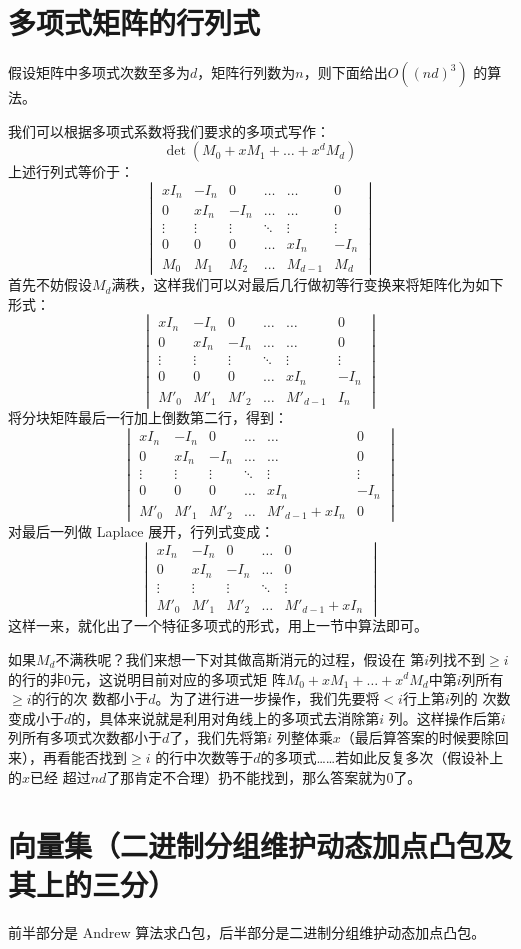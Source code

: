 \section{多项式矩阵的行列式}
假设矩阵中多项式次数至多为$d$，矩阵行列数为$n$，则下面给出$O((nd)^3)$
的算法。\par
我们可以根据多项式系数将我们要求的多项式写作：
\[\det(M_0+xM_1+\ldots+x^{d}M_d)\]
上述行列式等价于：
\[\begin{vmatrix}
  xI_n & -I_n & 0 & \ldots & \ldots & 0\\
  0 & xI_n & -I_n & \ldots & \ldots & 0\\
  \vdots & \vdots & \vdots & \ddots & \vdots & \vdots\\
  0 & 0 & 0 & \ldots & xI_n & -I_n\\
  M_0 & M_1 & M_2 & \ldots & M_{d-1} & M_d
\end{vmatrix}\]
首先不妨假设$M_d$满秩，这样我们可以对最后几行做初等行变换来将矩阵化为如下形式：
$$
\begin{vmatrix}
xI_n & -I_n & 0 & \ldots & \ldots & 0\\
0 & xI_n & -I_n & \ldots & \ldots & 0\\
\vdots & \vdots & \vdots & \ddots & \vdots & \vdots\\
0 & 0 & 0 & \ldots & xI_n & -I_n\\
M'_0 & M'_1 & M'_2 & \ldots & M'_{d-1} & I_n
\end{vmatrix}
$$
将分块矩阵最后一行加上倒数第二行，得到：
$$
\begin{vmatrix}
xI_n & -I_n & 0 & \ldots & \ldots & 0\\
0 & xI_n & -I_n & \ldots & \ldots & 0\\
\vdots & \vdots & \vdots & \ddots & \vdots & \vdots\\
0 & 0 & 0 & \ldots & xI_n & -I_n\\
M'_0 & M'_1 & M'_2 & \ldots & M'_{d-1}+xI_n & 0
\end{vmatrix}
$$
对最后一列做 Laplace 展开，行列式变成：
$$
\begin{vmatrix}
xI_n & -I_n & 0 & \ldots & 0\\
0 & xI_n & -I_n & \ldots & 0\\
\vdots & \vdots & \vdots & \ddots & \vdots\\
M'_0 & M'_1 & M'_2 & \ldots & M'_{d-1}+xI_n
\end{vmatrix}
$$
这样一来，就化出了一个特征多项式的形式，用上一节中算法即可。\par
如果$M_d$不满秩呢？我们来想一下对其做高斯消元的过程，假设在
第$i$​列找不到$\ge i$​的行的非$0$​元，这说明目前对应的多项式矩
阵$M_0+xM_1+\ldots+x^{d}M_d$​​中第$i$​列所有$\ge i$​的行的次
数都小于$d$​。为了进行进一步操作，我们先要将$<i$​行上第$i$​列的
次数变成小于$d$​​的，具体来说就是利用对角线上的多项式去消除第$i$
列。这样操作后第$i$列所有多项式次数都小于$d$了，我们先将第$i$
列整体乘$x$（最后算答案的时候要除回来），再看能否找到$\ge i$
的行中次数等于$d$的多项式……若如此反复多次（假设补上的$x$已经
超过$nd$了那肯定不合理）扔不能找到，那么答案就为$0$​了。


\section{向量集（二进制分组维护动态加点凸包及其上的三分）}
前半部分是 Andrew 算法求凸包，后半部分是二进制分组维护动态加点凸包。
